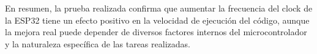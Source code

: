 En resumen, la prueba realizada confirma que aumentar la frecuencia del clock de la ESP32 tiene un efecto positivo en la velocidad de ejecución del código, aunque la mejora real puede depender de diversos factores internos del microcontrolador y la naturaleza específica de las tareas realizadas.




  
